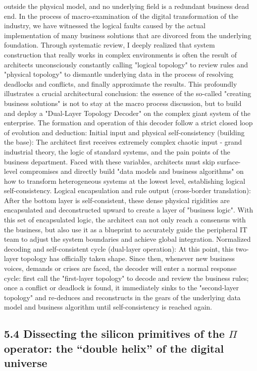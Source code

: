 \documentclass[11pt,a4paper]{article}
\begin{document}
outside the physical model, and no underlying field is a redundant business dead end. In the process of macro-examination of the digital transformation of the industry, we have witnessed the logical faults caused by the actual implementation of many business solutions that are divorced from the underlying foundation. Through systematic review, I deeply realized that system construction that really works in complex environments is often the result of architects unconsciously constantly calling "logical topology" to review rules and "physical topology" to dismantle underlying data in the process of resolving deadlocks and conflicts, and finally approximate the results. This profoundly illustrates a crucial architectural conclusion: the essence of the so-called "creating business solutions" is not to stay at the macro process discussion, but to build and deploy a "Dual-Layer Topology Decoder" on the complex giant system of the enterprise. The formation and operation of this decoder follow a strict closed loop of evolution and deduction: Initial input and physical self-consistency (building the base): The architect first receives extremely complex chaotic input - grand industrial theory, the logic of standard systems, and the pain points of the business department. Faced with these variables, architects must skip surface-level compromises and directly build "data models and business algorithms" on how to transform heterogeneous systems at the lowest level, establishing logical self-consistency. Logical encapsulation and rule output (cross-border translation): After the bottom layer is self-consistent, these dense physical rigidities are encapsulated and deconstructed upward to create a layer of "business logic". With this set of encapsulated logic, the architect can not only reach a consensus with the business, but also use it as a blueprint to accurately guide the peripheral IT team to adjust the system boundaries and achieve global integration. Normalized decoding and self-consistent cycle (dual-layer operation): At this point, this two-layer topology has officially taken shape. Since then, whenever new business voices, demands or crises are faced, the decoder will enter a normal response cycle: first call the "first-layer topology" to decode and review the business rules; once a conflict or deadlock is found, it immediately sinks to the "second-layer topology" and re-deduces and reconstructs in the gears of the underlying data model and business algorithm until self-consistency is reached again.


\subsection*{5.4 Dissecting the silicon primitives of the $\Pi$ operator: the “double helix” of the digital universe}
\end{document}
